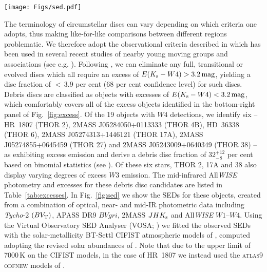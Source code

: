 \documentclass[usenatbib]{mnras}
\begin{document}
\begin{figure*}
\centering
\texttt{[image: Figs/sed.pdf]}
\caption[]{Spectral energy distributions of six members of the
  32~Ori group for which we have identified excess $W4$ emission at
  22\,$\mu$m. Note that the uncertainties on the individual points are
  typically smaller than the symbols used. In all cases except
  HR~1807, for which we used the \textsc{atlas9} \textsc{odfnew}
  models, the BT-Settl CIFIST models have been adopted to compare
  against the photometric data.}
\label{fig:sed}
\end{figure*}

The terminology of circumstellar discs can vary depending on which
criteria one adopts, thus making like-for-like comparisons between
different regions problematic. We therefore adopt the observational
criteria described in \cite{Luhman12} which has been used in several
recent studies of nearby young moving groups and associations (see
e.g. \citealp{Kraus14,Pecaut16}). Following \citeauthor{Luhman12}, we
can eliminate any full, transitional or evolved discs which all
require an excess of $E(K_{\rm{s}}-W4) > 3.2\,\rm{mag}$, yielding a
disc fraction of $<$\,3.9 per cent (68 per cent confidence level) for
such discs. Debris discs are classified as objects with excesses of
$E(K_{\rm{s}}-W4) < 3.2\,\rm{mag}$, which comfortably covers all of
the excess objects identified in the bottom-right panel of
Fig.~\ref{fig:excess}. Of the 19 objects with $W4$ detections, we
identify six -- HR~1807 (THOR 2), 2MASS J05284050+0113333
(THOR 4B), HD~36338 (THOR 6), 2MASS J05274313+1446121
(THOR 17A), 2MASS J05274855+0645459 (THOR 27) and
2MASS J05243009+0640349 (THOR 38) --
as exhibiting excess emission and derive a debris disc
fraction of $32^{+12}_{-8}$ per cent based on binomial statistics (see \citealp{Cameron11}).
Of these six stars, THOR 2, 17A and 38 also display varying degrees of excess
$W3$ emission.
The mid-infrared All\emph{WISE} photometry and excesses for these debris
disc candidates are listed in Table~\ref{tab:excesses}. In Fig.~\ref{fig:sed} we show
the SEDs for these objects, created
from a combination of optical, near- and mid-IR photometric data
including \emph{Tycho}-2 $(BV_{\rm{T}})$, APASS DR9 $BVgri$, 2MASS
$JHK_{\rm{s}}$ and All\emph{WISE} $W1$--$W4$. Using the Virtual Observatory SED
Analyser (VOSA; \citealp{Bayo08}) we fitted the observed SEDs with the
solar-metallicity BT-Settl CIFIST atmospheric models of
\cite*{Allard11}, computed adopting the revised solar abundances of
\cite{Caffau11}. Note that due to the upper limit of 7000\,K on the
CIFIST models, in the case of HR~1807 we instead used the
\textsc{atlas9} \textsc{odfnew} models of \cite{Castelli04}.
\end{document}
